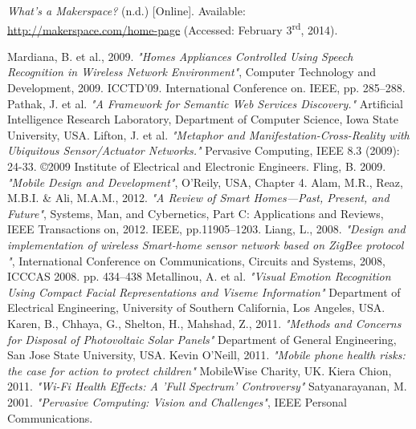 \documentclass[a4paper, 11pt]{article}
\begin{document}
\begin{thebibliography}{9}
     \emph{What’s a Makerspace?} (n.d.) [Online]. Available: \\ \href{http://makerspace.com/home-page}{http://makerspace.com/home-page} (Accessed: February 3\textsuperscript{rd}, 2014).
    
     Mardiana, B. et al., 2009. \emph{"Homes Appliances Controlled Using Speech Recognition in Wireless Network Environment"}, Computer Technology and Development, 2009. ICCTD’09. International Conference on. IEEE, pp.                        
285–288.
     Pathak, J. et al. \emph{"A Framework for Semantic Web Services Discovery."} Artificial Intelligence Research Laboratory, Department of Computer Science, Iowa State University, USA.
     Lifton, J. et al. \emph{"Metaphor and Manifestation-Cross-Reality with Ubiquitous Sensor/Actuator Networks."} Pervasive Computing, IEEE 8.3 (2009): 24-33. \copyright 2009 Institute of Electrical and Electronic Engineers.
     Fling, B. 2009. \emph{"Mobile Design and Development"}, O'Reily, USA, Chapter 4.
     Alam, M.R., Reaz, M.B.I. \& Ali, M.A.M., 2012. \emph{"A Review of Smart Homes—Past, Present, and Future"}, Systems, Man, and Cybernetics, Part C: Applications and Reviews, IEEE Transactions on, 2012. IEEE, pp.11905–1203.
     Liang, L., 2008. \emph{"Design and implementation of wireless Smart-home sensor network based on ZigBee protocol "}, International Conference on Communications, Circuits and Systems, 2008, ICCCAS 2008. pp. 434–438
     Metallinou, A. et al. \emph{"Visual Emotion Recognition Using Compact Facial Representations and Viseme Information"} Department of Electrical Engineering, University of Southern California, Los Angeles, USA.
     Karen, B., Chhaya, G., Shelton, H., Mahshad, Z., 2011. \emph{"Methods and Concerns for Disposal of Photovoltaic Solar Panels"}  Department of General Engineering, San Jose State University, USA.
     Kevin O’Neill, 2011. \emph{"Mobile phone health risks:
the case for action to protect children"} MobileWise Charity, UK.
     Kiera Chion, 2011. \emph{"Wi-Fi Health Effects: A 'Full Spectrum' Controversy"}
     Satyanarayanan, M. 2001. \emph{"Pervasive Computing: Vision and Challenges"}, IEEE Personal Communications.
\end{thebibliography}
\end{document}
